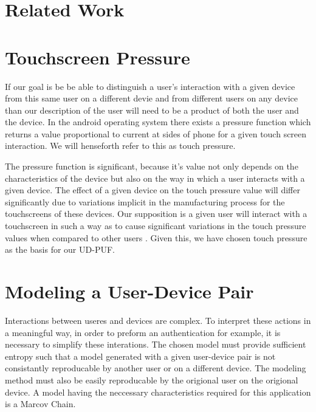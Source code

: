 \documentclass{acm_proc_article-sp}
\begin{document}


\section{Related Work}
\label{sec:related_work}


\section{Touchscreen Pressure}
\label{sec:touchscreen}
If our goal is be be able to distinguish a user's interaction with a given device from this same user on a different devie and from different users on any device than our description of the user will need to be a product of both the user and the device. In the android operating system there exists a pressure function which returns a value proportional to current at sides of phone for a given touch screen interaction. \cite{zhu2013sensec} We will henseforth refer to this as touch pressure. 

The pressure function is significant, because it's value not only depends on the characteristics of the device but also on the way in which a user interacts with a given device. The effect of a given device on the touch pressure value will differ significantly due to variations implicit in the manufacturing process for the touchscreens of these devices. \cite{manufacturing_differences} Our supposition is a given user will interact with a touchscreen in such a way as to cause significant variations in the touch pressure values when compared to other users \cite{user_touchscreen_interations}.  Given this, we have chosen touch pressure as the basis for our UD-PUF.

\section{Modeling a User-Device Pair}
\label{sec:modeling}
Interactions between useres and devices are complex. To interpret these actions in a meaningful way, in order to preform an authentication for example, it is necessary to simplify these interations. The chosen model must provide sufficient entropy such that a model generated with a given user-device pair is not consistantly reproducable by another user or on a different device. The modeling method must also be easily reproducable by the origional user on the origional device. A model having the neccessary characteristics required for this application is a Marcov Chain.
\end{document}
